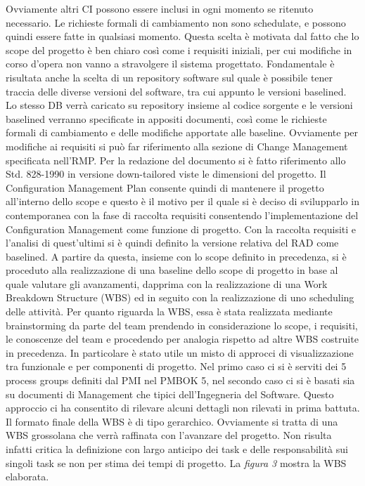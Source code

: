 Ovviamente altri CI possono essere inclusi in ogni momento se ritenuto necessario.
Le richieste formali di cambiamento non sono schedulate, e possono quindi essere fatte in qualsiasi momento. Questa scelta \`{e} motivata dal fatto che lo scope del progetto \`{e} ben chiaro cos\`{i} come i requisiti iniziali, per cui modifiche in corso d\rq opera non vanno a stravolgere il sistema progettato.
Fondamentale \`{e} risultata anche la scelta di un repository software sul quale \`{e} possibile tener traccia delle diverse versioni del software, tra cui appunto le versioni baselined. Lo stesso DB verr\`{a} caricato su repository insieme al codice sorgente e le versioni baselined verranno specificate in appositi documenti, cos\`{i} come le richieste formali di cambiamento e delle modifiche apportate alle baseline.
Ovviamente per modifiche ai requisiti si pu\`{o} far riferimento alla sezione di Change Management specificata nell\rq RMP.
Per la redazione del documento si \`{e} fatto riferimento allo Std. 828-1990 in versione down-tailored viste le dimensioni del progetto.
Il Configuration Management Plan consente quindi di mantenere il progetto all\rq interno dello scope e questo \`{e} il motivo per il quale si \`{e} deciso di svilupparlo in contemporanea con la fase di raccolta requisiti consentendo l\rq implementazione del Configuration Management come funzione di progetto.
Con la raccolta requisiti e l\rq analisi di quest\rq ultimi si \`{e} quindi definito la versione relativa del RAD come baselined.
A partire da questa, insieme con lo scope definito in precedenza, si \`{e} proceduto alla realizzazione di una baseline dello scope di progetto in base al quale valutare gli avanzamenti, dapprima con la realizzazione di una Work Breakdown Structure (WBS) ed in seguito con la realizzazione di uno scheduling delle attivit\`{a}.
Per quanto riguarda la WBS, essa \`{e} stata realizzata mediante brainstorming da parte del team prendendo in considerazione lo scope, i requisiti, le conoscenze del team e procedendo per analogia rispetto ad altre WBS costruite in precedenza.
In particolare \`{e} stato utile un misto di approcci di visualizzazione tra funzionale e per componenti di progetto. Nel primo caso ci si \`{e} serviti dei 5 process groups definiti dal PMI nel PMBOK 5, nel secondo caso ci si \`{e} basati sia su documenti di Management che tipici dell\rq Ingegneria del Software.
Questo approccio ci ha consentito di rilevare alcuni dettagli non rilevati in prima battuta. 
Il formato finale della WBS \`{e} di tipo gerarchico. Ovviamente si tratta di una WBS grossolana che verr\`{a} raffinata con l’avanzare del progetto. Non risulta infatti critica la definizione con largo anticipo dei task e delle responsabilit\`{a} sui singoli task se non per stima dei tempi di progetto.
La \emph{figura 3} mostra la WBS elaborata.

